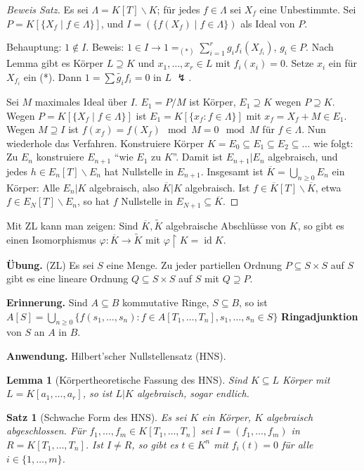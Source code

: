 \documentclass[headsepline=true,DIV=11]{scrartcl}
\newtheorem*{theorem}{Satz}
\newtheorem*{lemma}{Lemma}
\theoremstyle{definition}
\renewcommand{\bar}[1]{\overline{#1}}
\newcommand{\id}{\operatorname{id}}
\begin{document}
\begin{proof}[Beweis Satz]
  Es sei $\Lambda=K[T]\backslash K$; für jedes $f\in\Lambda$ sei $X_f$ eine Unbestimmte. Sei $P=K[\{X_f\mid f\in\Lambda\}]$, und $I=(\{f(X_f)\mid
  f\in\Lambda\})$ als Ideal von $P$.

  Behauptung: $1\not\in I$. Beweis: $1\in I\rightarrow 1=_{(*)}\sum\limits_{i=1}^r g_i f_i(X_{f_i})$, $g_i\in P$. Nach Lemma gibt es Körper
  $L\supseteq K$ und $x_1,\ldots,x_r\in L$ mit $f_i(x_i)=0$. Setze $x_i$ ein für $X_{f_i}$ ein (*). Dann $1=\sum\tilde{g_i}f_i=0$ in $L$ $\lightning$.

  Sei $M$ maximales Ideal über $I$. $E_1=P/M$ ist Körper, $E_1\supseteq K$ wegen $P\supseteq K$. Wegen $P=K[\{X_f\mid f\in\Lambda\}]$ ist $E_1=K[\{x_f:f\in\Lambda\}]$ mit $x_f=X_f+M\in
  E_1$. Wegen $M\supseteq I$ ist $f(x_f) = f(X_f)\mod M = 0\mod M$ für $f\in\Lambda$. Nun wiederhole das Verfahren. Konstruiere Körper $K=E_0\subseteq
  E_1\subseteq E_2\subseteq \ldots$ wie folgt: Zu $E_n$ konstruiere $E_{n+1}$ ``wie $E_1$ zu $K$''. Damit ist $E_{n+1}|E_n$ algebraisch, und jedes
  $h\in E_n[T]\backslash E_n$ hat Nullstelle in $E_{n+1}$. Insgesamt ist $\bar{K}=\bigcup\limits_{n\ge 0}E_n$ ein Körper: Alle $E_n|K$ algebraisch,
  also $\bar{K}|K$ algebraisch. Ist $f\in\bar{K}[T]\backslash\bar{K}$, etwa $f\in E_N[T]\backslash E_n$, so hat $f$ Nullstelle in
  $E_{N+1}\subseteq\bar{K}$.
\end{proof}

Mit ZL kann man zeigen: Sind $\bar{K},\tilde{K}$ algebraische Abschlüsse von $K$, so gibt es einen Isomorphismus $\varphi:\bar{K}\rightarrow\tilde{K}$
mit $\varphi\upharpoonright K=\id K$.

{\bf Übung.} (ZL) Es sei $S$ eine Menge. Zu jeder partiellen Ordnung $P\subseteq S\times S$ auf $S$ gibt es eine lineare Ordnung $Q\subseteq S\times
S$ auf $S$ mit $Q\supseteq P$.

{\bf Erinnerung.} Sind $A\subseteq B$ kommutative Ringe, $S\subseteq B$, so ist $A[S]=\bigcup\limits_{n\ge 0}\{f(s_1,\ldots,s_n):f\in
A[T_1,\ldots,T_n],s_1,\ldots,s_n\in S\}$ {\bf Ringadjunktion} von $S$ an $A$ in $B$.

{\bf Anwendung.} Hilbert'scher Nullstellensatz (HNS).

\begin{lemma}[Körpertheoretische Fassung des HNS]
  Sind $K\subseteq L$ Körper mit $L=K[a_1,\ldots,a_r]$, so ist $L|K$ algebraisch, sogar endlich.
\end{lemma}

\begin{theorem}[Schwache Form des HNS]
  Es sei $K$ ein Körper, $K$ algebraisch abgeschlossen. Für $f_1,\ldots,f_m\in K[T_1,\ldots,T_n]$ sei $I=(f_1,\ldots,f_m)$ in
  $R=K[T_1,\ldots,T_n]$. Ist $I\neq R$, so gibt es $t\in K^n$ mit $f_i(t)=0$ für alle $i\in\{1,\ldots,m\}$.
\end{theorem}
\end{document}
